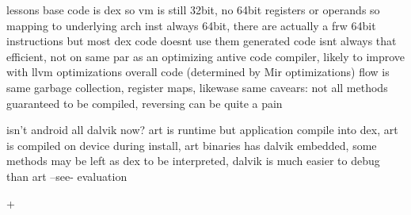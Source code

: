 lessons
base code is dex so vm is still 32bit, no 64bit registers or operands so mapping to underlying arch inst always 64bit, there are actually a frw 64bit instructions but most dex code doesnt use them
generated code isnt always that efficient, not on same par as an optimizing antive code compiler, likely to improve with llvm optimizations
overall code (determined by Mir optimizations) flow is same
garbage collection, register maps, likewase same
cavears: not all methods guaranteed to be compiled, reversing can be quite a pain
\newline


isn't android all dalvik now?
art is runtime but application compile into dex, art is compiled on device during install, art binaries has dalvik embedded, some methods may be left as dex to be interpreted, dalvik is much easier to debug than art --see- evaluation \newline
\cite{andevconDalvikART}
%

+

